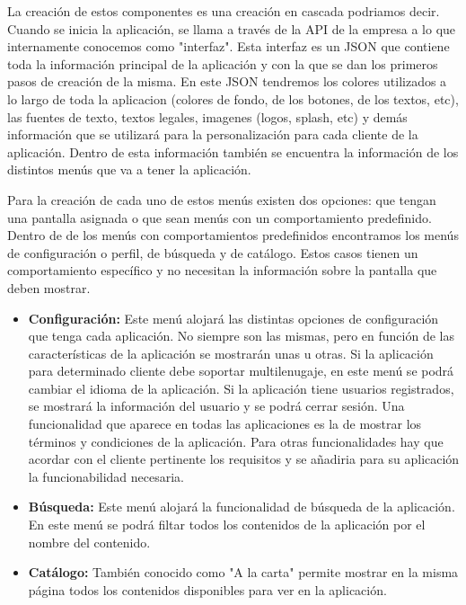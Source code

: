 La creación de estos componentes es una creación en cascada podriamos decir. Cuando se inicia la aplicación, se llama a través de la 
API de la empresa a lo que internamente conocemos como "interfaz". Esta interfaz es un JSON que contiene toda la información principal de la aplicación
y con la que se dan los primeros pasos de creación de la misma. En este JSON tendremos los colores utilizados a lo largo de toda la aplicacion (colores de fondo,
de los botones, de los textos, etc), las fuentes de texto, textos legales, imagenes (logos, splash, etc) y demás información que se utilizará para la personalización
para cada cliente de la aplicación. Dentro de esta información también se encuentra la información de los distintos menús que va a tener la aplicación. 

Para la creación de cada uno de estos menús existen dos opciones: que tengan una pantalla asignada o que sean menús con un comportamiento predefinido. Dentro de 
de los menús con comportamientos predefinidos encontramos los menús de configuración o perfil, de búsqueda y de catálogo. Estos casos tienen un comportamiento
específico y no necesitan la información sobre la pantalla que deben mostrar. 

\begin{itemize}
    \item \textbf{Configuración:} Este  menú alojará las distintas opciones de configuración que tenga cada aplicación. No siempre son las mismas, pero en función 
    de las características de la aplicación se mostrarán unas u otras. Si la aplicación para determinado cliente debe soportar multilenugaje, en este menú se podrá
    cambiar el idioma de la aplicación. Si la aplicación tiene usuarios registrados, se mostrará la información del usuario y se podrá cerrar sesión. Una funcionalidad
    que aparece en todas las aplicaciones es la de mostrar los términos y condiciones de la aplicación. Para otras funcionalidades hay que acordar con el cliente 
    pertinente los requisitos y se añadiria para su aplicación la funcionabilidad necesaria. 
    \item \textbf{Búsqueda:} Este menú alojará la funcionalidad de búsqueda de la aplicación. En este menú se podrá filtar todos los contenidos de la aplicación
    por el nombre del contenido.
    \item \textbf{Catálogo:} También conocido como "A la carta" permite mostrar en la misma página todos los contenidos disponibles para ver en la aplicación.
\end{itemize}


